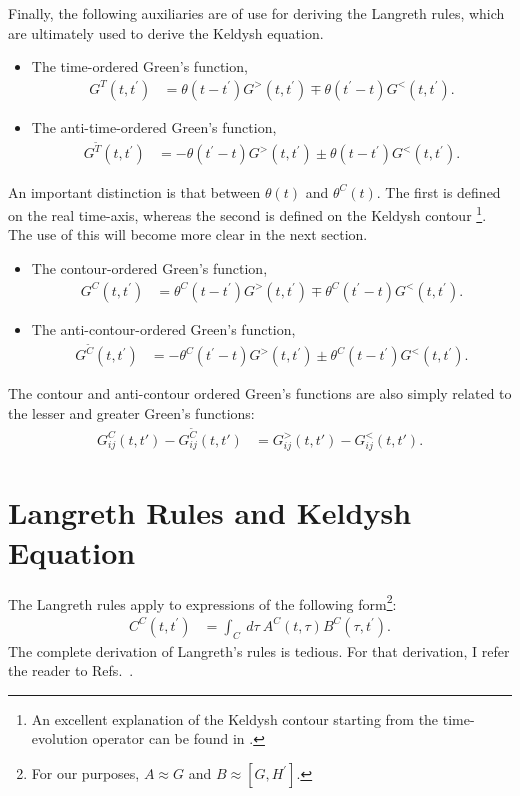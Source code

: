Finally, the following auxiliaries are of use for deriving the Langreth rules, which are ultimately used to derive the Keldysh equation.
\begin{itemize}
\item The time-ordered Green's function, \begin{align*}
G^T(t,t^\prime) &= \theta(t-t^\prime) G^>(t,t^\prime)  \mp \theta(t^\prime-t)G^<(t,t^\prime) .
\end{align*}
\item The anti-time-ordered Green's function, \begin{align*}
G^{\tilde{T}}(t,t^\prime) &= - \theta(t^\prime-t) G^>(t,t^\prime)  \pm \theta(t-t^\prime)G^<(t,t^\prime) .
\end{align*} 
\end{itemize}

An important distinction is that between $\theta (t)$ and $\theta^C(t)$. The first is defined on the real time-axis, whereas the second is defined on the Keldysh contour \footnote{An excellent explanation of the Keldysh contour starting from the time-evolution operator can be found in \citet{diventra}.}. The use of this will become more clear in the next section. 
\begin{itemize}
\item The contour-ordered Green's function, \begin{align*}
G^C(t,t^\prime) &= \theta^C(t-t^\prime) G^>(t,t^\prime)  \mp \theta^C(t^\prime-t)G^<(t,t^\prime) .
\end{align*}
\item The anti-contour-ordered Green's function, \begin{align*}
G^{\tilde{C}}(t,t^\prime) &= - \theta^C(t^\prime-t) G^>(t,t^\prime)  \pm \theta^C(t-t^\prime)G^<(t,t^\prime).
\end{align*} 
\end{itemize}


The contour and anti-contour ordered Green's functions are also simply related to the lesser and greater Green's functions:
\begin{align*}
G^C_{ij}(t,t') - G^{\tilde{C}}_{ij}(t,t') &= G^>_{ij}(t,t') - G^<_{ij}(t,t').
\end{align*}

\section{Langreth Rules and Keldysh Equation}
The Langreth rules apply to expressions of the following form\footnote{For our purposes, $A \approx G$ and $B \approx [G, H^\prime]$.}:
\begin{align*}
C^C(t,t^\prime) &= \int_C\:d\tau\:A^C(t,\tau) B^C (\tau, t^\prime).
\end{align*}
The complete derivation of Langreth's rules is tedious. For that derivation, I refer the reader to Refs.~\cite{mattuck,haugjauho}.
 
